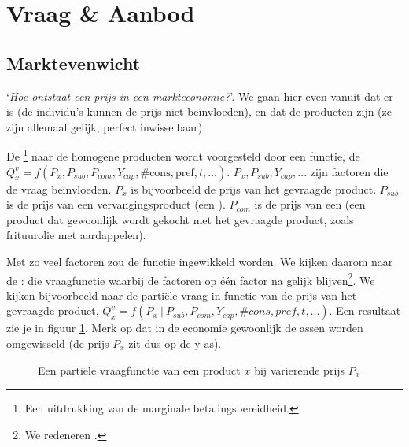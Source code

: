 \section{Vraag \& Aanbod}

\subsection{Marktevenwicht}

`\textit{Hoe ontstaat een prijs in een markteconomie?}'. We gaan hier even vanuit dat er  is (de individu's kunnen de prijs niet be\"invloeden), en dat de producten  zijn (ze zijn allemaal gelijk, perfect inwisselbaar).\\

\par De \footnote{Een uitdrukking van de marginale betalingsbereidheid.} naar de homogene producten wordt voorgesteld door een functie, de  $Q_x^v=f(P_x,P_{sub},P_{com},Y_{cap},\#\text{cons},\text{pref},t, ...)$. $P_x,P_{sub},Y_{cap}, ...$ zijn factoren die de vraag be\"invloeden. $P_x$ is bijvoorbeeld de prijs van het gevraagde product. $P_{sub}$ is de prijs van een vervangingsproduct (een ). $P_{com}$ is de prijs van een  (een product dat gewoonlijk wordt gekocht met het gevraagde product, zoals frituurolie met aardappelen).
\par Met zo veel factoren zou de functie ingewikkeld worden. We kijken daarom naar de  : die vraagfunctie waarbij de factoren op \'e\'en factor na gelijk blijven\footnote{We redeneren .}. We kijken bijvoorbeeld naar de parti\"ele vraag in functie van de prijs van het gevraagde product, $Q_x^v=f(P_x\ |\ P_{sub}, P_{com}, Y_{cap}, \#cons, pref, t, ...)$. Een resultaat zie je in figuur \ref{fig:h2-vraagfunctie}. Merk op dat in de economie gewoonlijk de assen worden omgewisseld (de prijs $P_x$ zit dus op de y-as).

\begin{figure}[H]
\vspace{0.5cm}
\centering\small
\captionsetup{justification=centering,margin=2cm}
\caption{Een parti\"ele vraagfunctie van een product $x$ bij varierende prijs $P_x$}
\label{fig:h2-vraagfunctie}
\end{figure}

